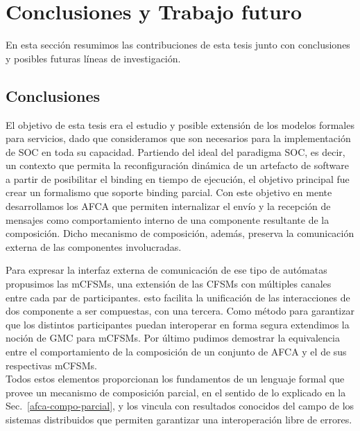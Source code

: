 \newpage
\chapter{Conclusiones y Trabajo futuro} 
\label{conclusiones}

En esta sección resumimos las contribuciones de esta tesis junto con conclusiones y posibles futuras líneas de investigación.


\section{Conclusiones} 

El objetivo de esta tesis era el estudio y posible extensión de los modelos formales para servicios, dado que consideramos que son necesarios para la implementación de SOC en toda su capacidad. Partiendo del ideal del paradigma SOC, es decir, un contexto que permita la reconfiguración dinámica de un artefacto de software a partir de posibilitar el binding en tiempo de ejecución, el objetivo principal fue crear un formalismo que soporte binding parcial. Con este objetivo en mente desarrollamos los AFCA que permiten internalizar el envío y la recepción de mensajes como comportamiento interno de una componente resultante de la composición. Dicho mecanismo de composición, además, preserva la comunicación externa de las componentes involucradas.

Para expresar la interfaz externa de comunicación de ese tipo de autómatas propusimos las mCFSMs, una extensión de las CFSMs con múltiples canales entre cada par de participantes. esto facilita la unificación de las interacciones de dos componente a ser compuestas, con una tercera. Como método para garantizar que los distintos participantes puedan interoperar en forma segura extendimos la noción de GMC para mCFSMs. Por último pudimos demostrar la equivalencia entre el comportamiento de la composición de un conjunto de AFCA y el de sus respectivas mCFSMs.\\
Todos estos elementos proporcionan los fundamentos de un lenguaje formal que provee un mecanismo de composición parcial, en el sentido de lo explicado en la Sec.~\ref{afca-compo-parcial}, y los vincula con resultados conocidos del campo de los sistemas distribuidos que permiten garantizar una interoperación libre de errores.



